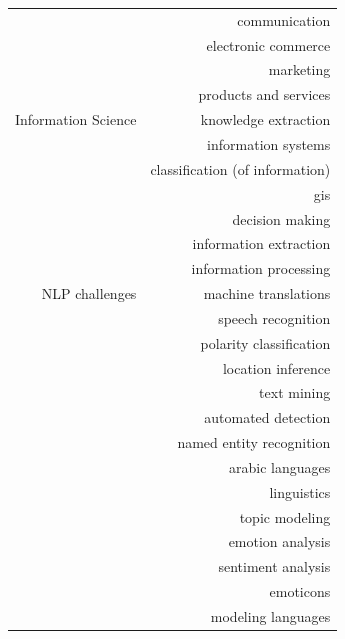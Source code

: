 \begin{center}
\begin{longtable}{ rr }
                              & communication                   \\
                              & electronic commerce             \\
                              & marketing                       \\
                              & products and services           \\
        \hline
        Information Science   & knowledge extraction            \\
                              & information systems             \\
                              & classification (of information) \\
                              & gis                             \\
                              & decision making                 \\
                              & information extraction          \\
                              & information processing          \\
        \hline
        NLP challenges        & machine translations            \\
                              & speech recognition              \\
                              & polarity classification         \\
                              & location inference              \\
                              & text mining                     \\
                              & automated detection             \\
                              & named entity recognition        \\
                              & arabic languages                \\
                              & linguistics                     \\
                              & topic modeling                  \\
                              & emotion analysis                \\
                              & sentiment analysis              \\
                              & emoticons                       \\
                              & modeling languages              \\

\end{longtable}
\end{center}
